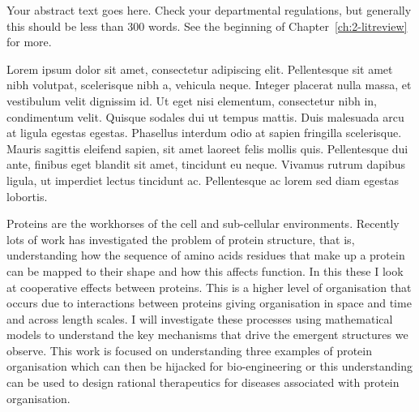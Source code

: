 Your abstract text goes here.  Check your departmental regulations, but generally this should be less than 300 words.  See the beginning of Chapter~\ref{ch:2-litreview} for more.

Lorem ipsum dolor sit amet, consectetur adipiscing elit. Pellentesque sit amet nibh volutpat, scelerisque nibh a, vehicula neque. Integer placerat nulla massa, et vestibulum velit dignissim id. Ut eget nisi elementum, consectetur nibh in, condimentum velit. Quisque sodales dui ut tempus mattis. Duis malesuada arcu at ligula egestas egestas. Phasellus interdum odio at sapien fringilla scelerisque. Mauris sagittis eleifend sapien, sit amet laoreet felis mollis quis. Pellentesque dui ante, finibus eget blandit sit amet, tincidunt eu neque. Vivamus rutrum dapibus ligula, ut imperdiet lectus tincidunt ac. Pellentesque ac lorem sed diam egestas lobortis.

Proteins are the workhorses of the cell and sub-cellular environments. Recently lots of work has investigated the problem of protein structure, that is, understanding how the sequence of amino acids residues that make up a protein can be mapped to their shape and how this affects function. In this these I look at cooperative effects between proteins. This is a higher level of organisation that occurs due to interactions between proteins giving organisation in space and time and across length scales. I will investigate these processes using mathematical models to understand the key mechanisms that drive the emergent structures we observe. This work is focused on understanding three examples of protein organisation which can then be hijacked for bio-engineering or this understanding can be used to design rational therapeutics for diseases associated with protein organisation.